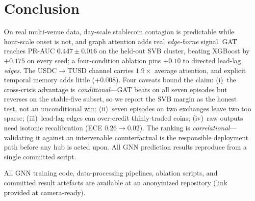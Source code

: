\documentclass[sigconf,anonymous]{acmart}
\begin{document}
\section{Conclusion}
On real multi-venue data, day-scale stablecoin contagion is predictable while hour-scale onset is
not, and graph attention adds real \emph{edge-borne} signal. GAT reaches PR-AUC $0.447\pm0.016$
on the held-out SVB cluster, beating XGBoost by $+0.175$ on every seed; a four-condition
ablation pins $+0.10$ to directed lead-lag \emph{edges}. The USDC$\to$TUSD channel carries
$1.9\times$ average attention, and explicit temporal memory adds little ($+0.008$). Four
caveats bound the claim: (i)~the cross-crisis advantage is \emph{conditional}---GAT beats on
all seven episodes but reverses on the stable-five subset, so we report the SVB margin as the
honest test, not an unconditional win; (ii)~seven episodes on two exchanges leave two too sparse;
(iii)~lead-lag edges can over-credit thinly-traded coins; (iv)~raw outputs need isotonic
recalibration (ECE $0.26\to0.02$). The ranking is \emph{correlational}---validating it against an intervenable
counterfactual is the responsible deployment path before any hub is acted upon. All GNN prediction results reproduce from a single committed script.

\begin{acks}
All GNN training code, data-processing pipelines, ablation scripts, and committed
result artefacts are available at an anonymized repository (link provided at camera-ready).
\end{acks}

{\footnotesize\setlength{\bibsep}{0pt plus 0.1ex}

}
\end{document}
